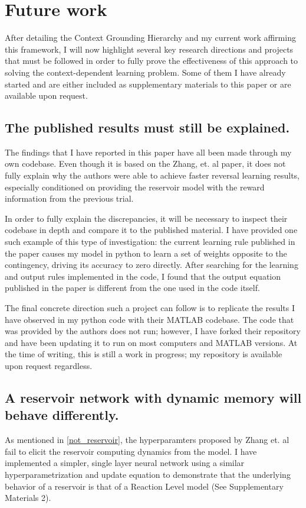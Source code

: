 \documentclass[11pt]{article}
\begin{document}
\section{Future work}
After detailing the Context Grounding Hierarchy and my current work affirming this framework, I will now highlight several key research directions and projects that must be followed in order to fully prove the effectiveness of this approach to solving the context-dependent learning problem.  Some of them I have already started and are either included as supplementary materials to this paper or are available upon request.

\subsection{The published results must still be explained.}
The findings that I have reported in this paper have all been made through my own codebase.  Even though it is based on the Zhang, et. al paper, it does not fully explain why the authors were able to achieve faster reversal learning results, especially conditioned on providing the reservoir model with the reward information from the previous trial.

In order to fully explain the discrepancies, it will be necessary to inspect their codebase in depth and compare it to the published material.  I have provided one such example of this type of investigation: the current learning rule published in the paper causes my model in python to learn a set of weights opposite to the contingency, driving its accuracy to zero directly.  After searching for the learning and output rules implemented in the code, I found that the output equation published in the paper is different from the one used in the code itself.

The final concrete direction such a project can follow is to replicate the results I have observed in my python code with their MATLAB codebase.  The code that was provided by the authors does not run; however, I have forked their repository and have been updating it to run on most computers and MATLAB versions.  At the time of writing, this is still a work in progress; my repository is available upon request regardless.

\subsection{A reservoir network with dynamic memory will behave differently.}
As mentioned in \autoref{not_reservoir}, the hyperparamters proposed by Zhang et. al fail to elicit the reservoir computing dynamics from the model.  I have implemented a simpler, single layer neural network using a similar hyperparametrization and update equation to demonstrate that the underlying behavior of a reservoir is that of a Reaction Level model (See Supplementary Materials 2).
\end{document}
